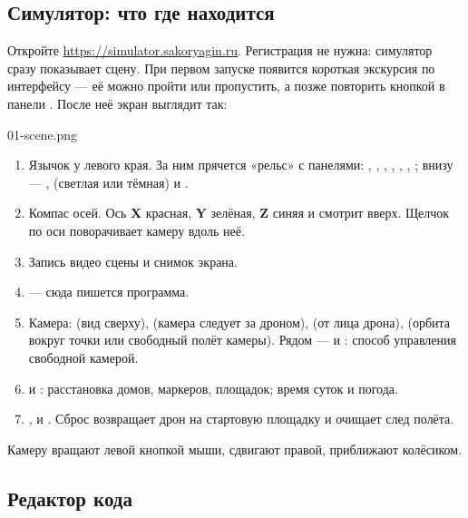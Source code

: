 \subsection{Симулятор: что где находится}
\label{sec:simulator-tour}

Откройте \url{https://simulator.sakoryagin.ru}. Регистрация не нужна: симулятор сразу показывает сцену. При первом запуске появится короткая экскурсия по интерфейсу --- её можно пройти или пропустить, а позже повторить кнопкой  в панели . После неё экран выглядит так:

\begin{shotcallouts}{01-scene.png}
\end{shotcallouts}

\begin{enumerate}[label=\bubble{\arabic*}]
    \item Язычок у левого края. За ним прячется «рельс» с панелями: , , , , , , ; внизу --- ,  (светлая или тёмная) и .
    \item Компас осей. Ось \textbf{X} красная, \textbf{Y} зелёная, \textbf{Z} синяя и смотрит вверх. Щелчок по оси поворачивает камеру вдоль неё.
    \item Запись видео сцены и снимок экрана.
    \item {} --- сюда пишется программа.
    \item Камера:  (вид сверху),  (камера следует за дроном),  (от лица дрона),  (орбита вокруг точки или свободный полёт камеры). Рядом ---  и : способ управления свободной камерой.
    \item {} и : расстановка домов, маркеров, площадок; время суток и погода.
    \item {},  и . Сброс возвращает дрон на стартовую площадку и очищает след полёта.
\end{enumerate}

Камеру вращают левой кнопкой мыши, сдвигают правой, приближают колёсиком.

\subsection{Редактор кода}

